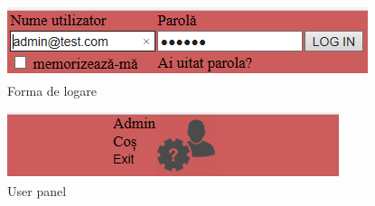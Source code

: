 \begin{figure}[!htb]
	\begin{center}
		\centering
		\includegraphics[scale = 0.9]{img/user_login}
		\caption{Forma de logare}%
		\label{fig:git_config}
	\end{center}
\end{figure}

\begin{figure}[htb]
	\begin{center}
		\centering
		\includegraphics[scale = 0.9]{img/user_panel}
		\caption{User panel}%
		\label{fig:gitinit}
	\end{center}
\end{figure}
\clearpage
